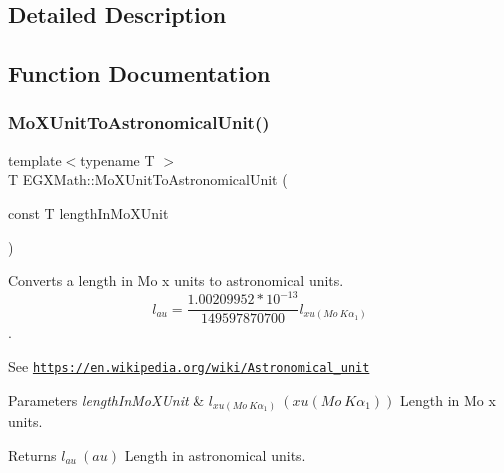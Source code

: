 \subsection{Detailed Description}


\subsection{Function Documentation}
\mbox{\label{group___e_g_x_math-_conversions-_length_conversions-_non-_s_i-_mo_x_unit-_astronomical_ga7a72c84200a6ae279a9fe7499db6e7f1}} 
\subsubsection{\texorpdfstring{Mo\+X\+Unit\+To\+Astronomical\+Unit()}{MoXUnitToAstronomicalUnit()}}
{\footnotesize\ttfamily template$<$typename T $>$ \\
T E\+G\+X\+Math\+::\+Mo\+X\+Unit\+To\+Astronomical\+Unit (\begin{DoxyParamCaption}\item[{const T}]{length\+In\+Mo\+X\+Unit }\end{DoxyParamCaption})}



Converts a length in Mo x units to astronomical units. \[ l_{au}= \frac{1.00209952*10^{-13}}{149597870700} l_{xu(Mo\ K\alpha_1)} \]. 

See \href{https://en.wikipedia.org/wiki/Astronomical_unit}{\tt https\+://en.\+wikipedia.\+org/wiki/\+Astronomical\+\_\+unit} 
\begin{DoxyParams}{Parameters}
{\em length\+In\+Mo\+X\+Unit} & $ l_{xu(Mo\ K\alpha_1)}\ (xu(Mo\ K\alpha_1))$ Length in Mo x units. \\
\hline
\end{DoxyParams}
\begin{DoxyReturn}{Returns}
$ l_{au}\ (au)$ Length in astronomical units. 
\end{DoxyReturn}
\mbox{\label{group___e_g_x_math-_conversions-_length_conversions-_non-_s_i-_mo_x_unit-_astronomical_ga5b2db9c0d1b2663190463aaf3203a27f}} 
